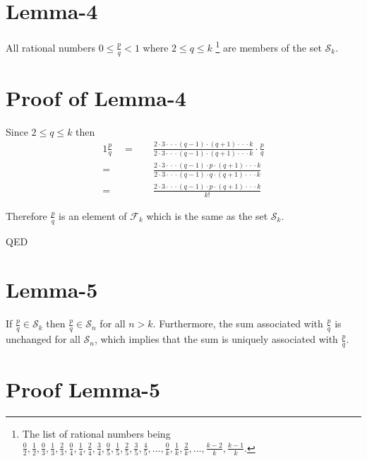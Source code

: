 \documentclass{article}
\begin{document}
\section*{Lemma-4}

All rational numbers
\(0\le{}\frac{p}{q}<1\)
where
\(2\le{}q\le{k}\)
\footnote{The list of
rational numbers being \(
\frac{0}{2},
\frac{1}{2},
\frac{0}{3},
\frac{1}{3},
\frac{2}{3},
\frac{0}{4},
\frac{1}{4},
\frac{2}{4},
\frac{3}{4},
\frac{0}{5},
\frac{1}{5},
\frac{2}{5},
\frac{3}{5},
\frac{4}{5},
\dots{},
\frac{0}{k},
\frac{1}{k},
\frac{2}{k},
\dots{},
\frac{k-2}{k},
\frac{k-1}{k}\).}
are members of the set \(\mathcal{S}_k\).

\section*{Proof of Lemma-4}
Since
\(2\le{}q\le{k}\)
then
{\normalsize
\bgroup                                  %
\setlength{\abovedisplayskip}{0pt}       %
\begin{alignat*}{1}
\frac{p}{q}\quad =\quad &\frac
{2\cdot{}3\cdot{}\cdot{}\cdot{}(q-1)\cdot{}(q+1)\cdot{}\cdot{}\cdot{}k}
{2\cdot{}3\cdot{}\cdot{}\cdot{}(q-1)\cdot{}(q+1)\cdot{}\cdot{}\cdot{}k} \cdot{} \frac{p}{q}\\
=\quad &\frac
{2\cdot{}3\cdot{}\cdot{}\cdot{}(q-1)\cdot{}p\cdot{}(q+1)\cdot{}\cdot{}\cdot{}k}
{2\cdot{}3\cdot{}\cdot{}\cdot{}(q-1)\cdot{}q\cdot{}(q+1)\cdot{}\cdot{}\cdot{}k}\\
=\quad &\frac
{2\cdot{}3\cdot{}\cdot{}\cdot{}(q-1)\cdot{}p\cdot{}(q+1)\cdot{}\cdot{}\cdot{}k}
{k!}
\end{alignat*}
\egroup
}

Therefore \(\frac{p}{q}\) is an element of \(\mathcal{F}_k\) which is the same as the set \(\mathcal{S}_k\).\par
QED

\section*{Lemma-5}

If \(\frac{p}{q} \in{} \mathcal{S}_k\) then \(\frac{p}{q} \in{} \mathcal{S}_n\) for all \(n > k\).
Furthermore, the sum associated with \(\frac{p}{q}\) is unchanged for all \(\mathcal{S}_n\),
which implies that the sum is uniquely associated with \(\frac{p}{q}\).

\break
\section*{Proof Lemma-5}
\end{document}
